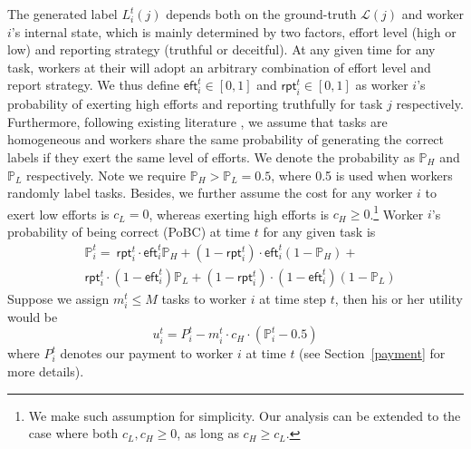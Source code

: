 The generated label $L^{t}_{i}(j)$ depends both on the ground-truth $\mathcal{L}(j)$ and worker $i$'s internal state, which is mainly determined by two factors, effort level (high or low) and reporting strategy (truthful or deceitful).
At any given time for any task, workers at their will adopt an arbitrary combination of effort level and report strategy. We thus define $\textsf{eft}^{t}_i\in[0,1]$ and $\textsf{rpt}^{t}_i\in[0,1]$ as worker $i$'s probability of exerting high efforts and reporting truthfully for task $j$ %
respectively. Furthermore, following existing literature \citet{dasgupta2013crowdsourced,liu2017sequential}, we assume that tasks are homogeneous and workers share the same probability of generating the correct labels if they exert the same level of efforts. We denote the probability as $\mathbb{P}_{H}$ and $\mathbb{P}_{L}$ respectively. Note we require $\mathbb{P}_{H} > \mathbb{P}_{L} = 0.5$, where 0.5 is used when workers randomly label tasks.
Besides, we further assume the cost for any worker $i$ to exert low efforts is $c_{L} = 0$, whereas exerting high efforts is $c_{H} \geq 0$.\footnote{We make such assumption for simplicity. Our analysis can be extended to the case where both $c_{L},  c_{H} \geq 0$, as long as $c_{H} \geq c_{L}$.}
Worker $i$'s probability of being correct (PoBC) at time $t$ for any given task is
\vspace{-3mm}
\begin{equation}
\begin{split}
&\mathbb{P}^{t}_i  = ~\textsf{rpt}^{t}_i \cdot\textsf{eft}^{t}_i \mathbb{P}_{H}+ (1-\textsf{rpt}^{t}_i)\cdot \textsf{eft}^{t}_i (1-\mathbb{P}_{ H})+\\
&\textsf{rpt}^{t}_i \cdot(1-\textsf{eft}^{t}_i) \mathbb{P}_{L}+(1-\textsf{rpt}^{t}_i) \cdot(1-\textsf{eft}^{t}_i) (1-\mathbb{P}_{L})
\end{split}
\end{equation}
Suppose we assign $m^{t}_i\leq M$ tasks to worker $i$ at time step $t$, then his or her utility would be 
\begin{equation}
\label{equation:u_of_worker}
u_i^t=P_i^t - m^{t}_i \cdot c_H\cdot (\mathbb{P}_i^t-0.5)
\end{equation}
where $P^{t}_{i}$ denotes our payment to worker $i$ at time $t$ (see Section~\ref{payment} for more details).

